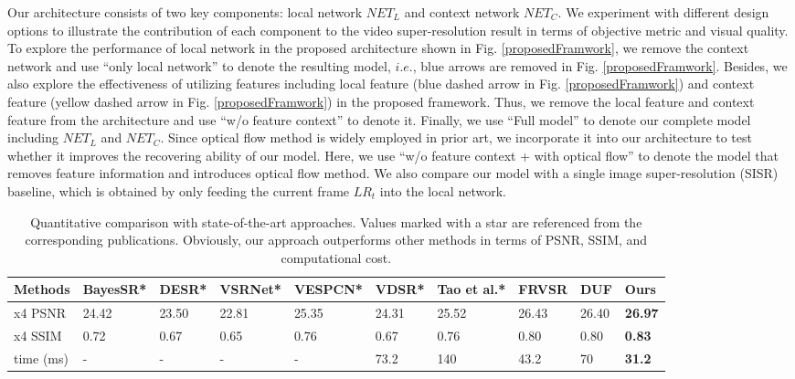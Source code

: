 \documentclass[letterpaper]{article} %
\begin{document}
Our architecture consists of two key components: local network $NET_L$ and context network $NET_C$. We experiment with different design options to illustrate the contribution of each component to the video super-resolution result in terms of objective metric and visual quality. To explore the performance of local network in the proposed architecture shown in Fig. \ref{proposedFramwork}, we remove the context network and use ``only local network'' to denote the resulting model, $i.e.$, blue arrows are removed in Fig. \ref{proposedFramwork}. Besides, we also explore the effectiveness of utilizing features including local feature (blue dashed arrow in Fig. \ref{proposedFramwork}) and context feature (yellow dashed arrow in Fig. \ref{proposedFramwork}) in the proposed framework. Thus, we remove the local feature and context feature from the architecture and use ``w/o feature context'' to denote it. Finally, we use ``Full model'' to denote our complete model including $NET_L$ and $NET_C$. Since optical flow method \cite{FRVSR2018cvpr} is widely employed in prior art, we incorporate it into our architecture to test whether it improves the recovering ability of our model. Here, we use ``w/o feature context + with optical flow'' to denote the model that removes feature information and introduces optical flow method. We also compare our model with a single image super-resolution (SISR) baseline, which is obtained by only feeding the current frame $LR_t$ into the local network.



\begin{table}[t]
\centering
\caption{Quantitative comparison with state-of-the-art approaches. Values marked with a star are referenced from the corresponding publications. Obviously, our approach outperforms other methods in terms of PSNR, SSIM, and computational cost.}
\begin{tabular}{llllllllll}
\hline
Methods   & BayesSR* & DESR*   & VSRNet* & VESPCN* & VDSR*   & Tao et al.* & FRVSR   & DUF     & \textbf{Ours}  \\ \hline
x4 PSNR   & 24.42    & 23.50   & 22.81   & 25.35   & 24.31   & 25.52       & 26.43   & 26.40   & \textbf{26.97} \\
x4 SSIM   & 0.72     & 0.67    & 0.65    & 0.76    & 0.67    & 0.76        & 0.80    & 0.80    & \textbf{0.83}  \\
time (ms)  &  -       &   -     &  -      &   -      & 73.2    & 140         & 43.2    & 70      & \textbf{31.2}  \\ \hline
\end{tabular}
\label{ComparisonQuantitativeArts}
\end{table}
\end{document}
